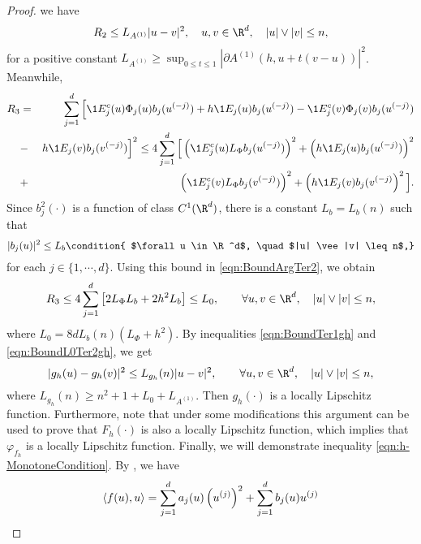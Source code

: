 \begin{proof}
we have
\begin{equation}\label{eqn:BoundTer1gh}
R_2
\leq
L_{A^{(1)}}|u-v|^2, \quad u,v \in \R^d, \quad |u|\vee |v|\leq n,
\end{equation}
for a positive constant $L_{A^{(1)}} \geq \sup_{0\leq t \leq 1} 
|\partial A^{(1)}(h, u+t(v-u))|^2$. Meanwhile, 
\begin{eqnarray}
R_3 &=&\sum_{j=1}^d\Big[\1{E_j^c}(u) \Phi_j(u) b_j(u^{(-j)}) + h \1{E_j}(u) b_j(u^{(-j)}) 
-\1{E_j^c}(v) \Phi_j(v) b_j(u^{(-j)})\nonumber \\ &-& h \1{E_j}(v) b_j(v^{(-j)})
\Big]^2 
\leq
4\sum_{j=1}^d
\Big[
\left(	
\1{E_j^c}(u) L_{\Phi} b_j(u^{(-j)})  
\right)^2
+
\left(
h \1{E_j}(u) b_j(u^{(-j)})
\right)^2
\nonumber\\&+&
\left(
\1{E_j^c}(v) L_{\Phi} b_j(v^{(-j)})
\right)^2
+
\left(
h \1{E_j}(v) b_j(v^{(-j)}
\right)^2
\Big].
\label{eqn:BoundArgTer2}	
\end{eqnarray}	
Since  $b^2_j(\cdot)$ is a function of class $C^1(\R^d)$, there is a 
constant $L_b=L_b(n)$ such that
\begin{dmath}[label={eqn:Boundbju}]
	|b_j(u)|^2 \leq L_b 
	\condition{
		$\forall u \in \R^d$,
		\quad $|u| \vee |v| \leq n$,}		
\end{dmath}
for each $j \in \{1,\cdots, d\}$. Using this bound in  \eqref{eqn:BoundArgTer2}, we obtain
\begin{equation}\label{eqn:BoundL0Ter2gh}
R_3\leq
4 \sum_{j=1}^d
\left[
2 L_{\Phi} L_b +2h^2 L_b
\right] 
\leq L_0, \qquad
\forall u,v \in \R^d,
\quad |u|\vee|v| \leq n,
\end{equation}
where $L_0=8d L_b(n)(L_{\Phi}+h^2)$.
By inequalities \eqref{eqn:BoundTer1gh} and \eqref{eqn:BoundL0Ter2gh},  we get
\begin{equation}
|g_h(u) - g_h(v)|^2 \leq L_{g_h}(n) |u - v|^2, 
\qquad	\forall u,v \in \R^d,
\quad |u|\vee |v| \leq n,		
\end{equation}
where $L_{g_h}(n)\geq n^2+1+L_0+ L_{A^{(1)}}$. Then $g_h(\cdot)$ is a locally 
Lipschitz function. Furthermore, note that under some modifications
this argument can be used to prove that $F_h(\cdot)$ is also a locally Lipschitz 
function, which implies that $\varphi_{f_{h}}$ is a locally Lipschitz function.
Finally, we  will demonstrate inequality \eqref{eqn:h-MonotoneCondition}. 
By , we have
\begin{equation*}\label{eqn:bDotProdBound}
	\innerprod{f(u)}{u}
	=
	\sum_{j=1}^d
	a_j(u) \left( u^{(j)} \right)^2
	+
	\sum_{j=1}^d
	b_j(u) u^{(j)}

\end{equation*}
\end{proof}
